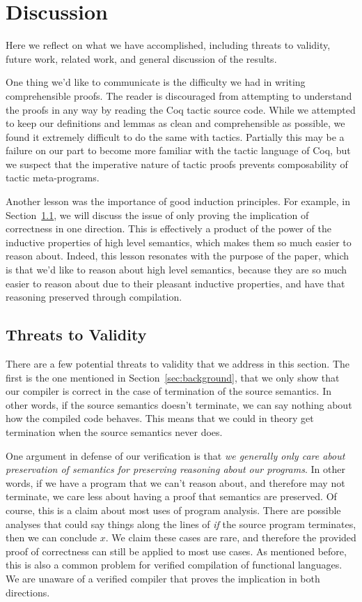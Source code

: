 \section{Discussion} \label{sec:discussion}

Here we reflect on what we have accomplished, including threats to validity,
future work, related work, and general discussion of the results.

One thing we'd like to communicate is the difficulty we had in writing
comprehensible proofs. The reader is discouraged from attempting to understand
the proofs in any way by reading the Coq tactic source code. While we attempted
to keep our definitions and lemmas as clean and comprehensible as possible, we
found it extremely difficult to do the same with tactics. Partially this may be
a failure on our part to become more familiar with the tactic language of Coq,
but we suspect that the imperative nature of tactic proofs prevents
composability of tactic meta-programs. 

Another lesson was the importance of good induction principles. For example, in
Section~\ref{sec:threats}, we will discuss the issue of only proving the
implication of correctness in one direction. This is effectively a product of
the power of the inductive properties of high level semantics, which makes them
so much easier to reason about. Indeed, this lesson resonates with the purpose
of the paper, which is that we'd like to reason about high level semantics,
because they are so much easier to reason about due to their pleasant inductive
properties, and have that reasoning preserved through compilation. 

\subsection{Threats to Validity} \label{sec:threats}

There are a few potential threats to validity that we address in this section. The
first is the one mentioned in Section~\ref{sec:background}, that we only show
that our compiler is correct in the case of termination of the source semantics.
In other words, if the source semantics doesn't terminate, we can say nothing
about how the compiled code behaves. This means that we could in theory get
termination when the source semantics never does. 

One argument in defense of our verification is that \emph{we generally only care
about preservation of semantics for preserving reasoning about our programs}. In
other words, if we have a program that we can't reason about, and therefore may
not terminate, we care less about having a proof that semantics are preserved.
Of course, this is a claim about most uses of program analysis. There are
possible analyses that could say things along the lines of \emph{if} the source
program terminates, then we can conclude $x$. We claim these cases are rare, and
therefore the provided proof of correctness can still be applied to most use
cases. As mentioned before, this is also a common problem for verified
compilation of functional languages. We are unaware of a verified compiler that
proves the implication in both directions. 

